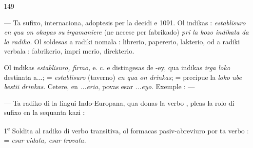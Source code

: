 \begin{VUpage}[153]{149}

 --- Ta sufixo, internaciona, adoptesis per la decidi e 1091. Ol indikas : \textit{establisuro en qua on okupas su}\nl
\textit{irgamaniere} (ne necese per fabrikado) \textit{pri la kozo indikata}\nl
\textit{da la radiko.} Ol soldesas a radiki nomala : librerio,\nl
papererio, lakterio, od a radiki verbala : fabrikerio, impri\cc
merio, direkterio.

Ol indikas \textit{establisuro, firmo,} e. c. e distingesas de -ey,\nl
qua indikas \textit{irga loko} destinata a...;  = \textit{establisuro}\nl
(taverno) \textit{en qua on drinkas};  = precipue la \textit{loko ube}\nl
\textit{bestii drinkas.} Cetere, en \textit{...erio}, povas esar \textit{...eyo.} Exemple : \nl
{} --- \nl
{}\nl
{}

 --- Ta radiko di la lingui Indo-Europana, qua donas\nl
la verbo , pleas la rolo di sufixo en la sequanta kazi :\parplein

1\textsuperscript{e} Soldita al radiko di verbo transitiva, ol formacas\nl
pasiv-abreviuro por ta verbo :  = \textit{esar}\nl
\textit{vidata, esar trovata.}


\end{VUpage}

